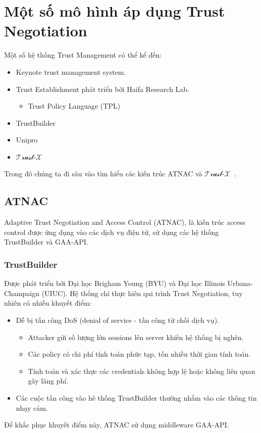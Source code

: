 \documentclass[12pt]{article}
\newcommand{\trustx}{$\mathcal{\text{Trust-}X}$\ }
\begin{document}
\section{Một số mô hình áp dụng Trust Negotiation}
Một số hệ thống Trust Management có thể kể đến:
\begin{itemize}
\item Keynote trust management system.
\item Trust Establishment phát triển bởi Haifa Research Lab.
\begin{itemize}
\item Trust Policy Language (TPL)\cite{848442}
\end{itemize}
\item TrustBuilder
\item Unipro
\item \trustx
\end{itemize}

Trong đó chúng ta đi sâu vào tìm hiểu các kiến trúc ATNAC và \trustx.

\subsection{ATNAC}
Adaptive Trust Negotiation and Access Control (ATNAC)\cite{10.1145/1063979.1064004}, là kiến trúc access control được ứng dụng vào các dịch vụ điện tử, sử dụng các hệ thống TrustBuilder và GAA-API. 

\subsubsection{TrustBuilder}
Được phát triển bởi Đại học Brigham Young (BYU) và Đại học Illinois Urbana-Champaign (UIUC). Hệ thống chỉ thực hiên qui trình Trust Negotiation, tuy nhiên có nhiều khuyết điểm:
\begin{itemize}
\item Dễ bị tấn công DoS (denial of service - tấn công từ chối dịch vụ).
\begin{itemize}
\item Attacker gửi số lượng lớn sessions lên server khiến hệ thống bị nghẽn.
\item Các policy có chi phí tính toán phức tạp, tốn nhiều thời gian tính toán.
\item Tính toán và xác thực các credentials không hợp lệ hoặc không liên quan gây lãng phí. 
\end{itemize}
\item Các cuộc tấn công vào hê thống TrustBuilder thường nhắm vào các thông tin nhạy cảm.
\end{itemize}
Để khắc phục khuyết điểm này, ATNAC sử dụng middleware GAA-API.
\end{document}
